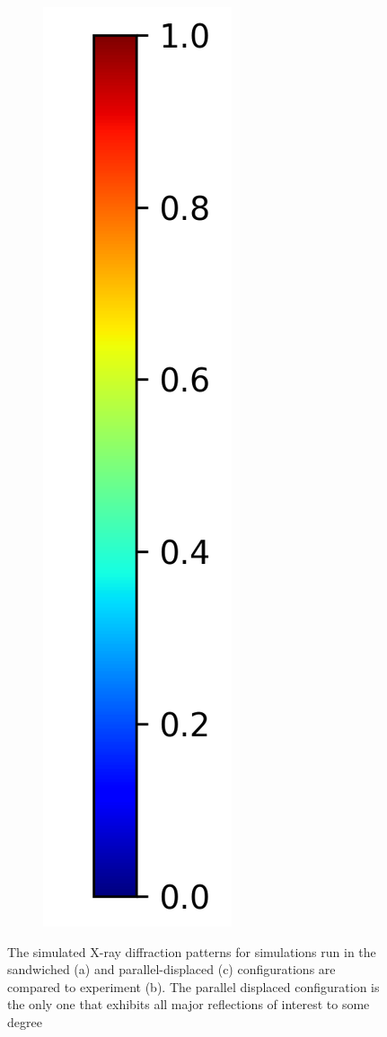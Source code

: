 \documentclass{article}
\begin{document}
\begin{figure}
\begin{subfigure}{0.0544\linewidth}
        \includegraphics[width=\linewidth]{colorbar_jet.png}
  \end{subfigure}
  \caption{The simulated X-ray diffraction patterns for simulations run in the
  sandwiched (a) and parallel-displaced (c) configurations are compared to experiment (b). 
  The parallel displaced configuration is the only one that exhibits all major
  reflections of interest to some degree}
  \end{figure}
\end{document}

